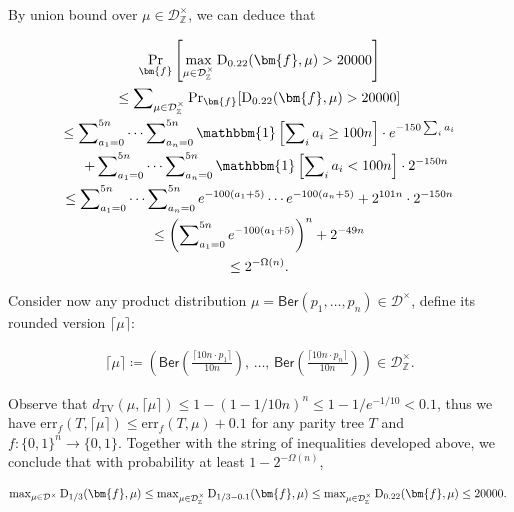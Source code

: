 \documentclass[10pt,a4paper]{article}
\begin{document}
By union bound over $\mu\in\mathcal{D}^{\times}_{\mathbb{Z}}$, we can deduce that\par


\[\begin{gathered}
\displaystyle\Pr_{\bm{f}}\left[\max_{\mu\in\mathcal{D}^{\times}_{\mathbb{Z}}}{\textup{D}}_{0.22}(\bm{f},\mu)>20000\right] \\
\displaystyle\leq \displaystyle\sum\nolimits_{\mu\in\mathcal{D}^{\times}_{\mathbb{Z}}}\Pr\nolimits_{\bm{f}}[{\textup{D}}_{0.22}(\bm{f},\mu)>20000] \\
\displaystyle\leq \displaystyle\sum\nolimits_{a_{1}=0}^{5n}\cdots\sum\nolimits_{a_{n}=0}^{5n}\mathbbm{1}\left[\sum\nolimits_{i}a_{i}\geq 100n\right]\cdot e^{-150\sum_{i}a_{i}} \\
\displaystyle\quad+\sum\nolimits_{a_{1}=0}^{5n}\cdots\sum\nolimits_{a_{n}=0}^{5n}\mathbbm{1}\left[\sum\nolimits_{i}a_{i}<100n\right]\cdot 2^{-150n} \\
\displaystyle\leq \displaystyle\sum\nolimits_{a_{1}=0}^{5n}\cdots\sum\nolimits_{a_{n}=0}^{5n}e^{-100(a_{1}+5)}\cdots e^{-100(a_{n}+5)}+2^{101n}\cdot 2^{-150n} \\
\displaystyle\leq \displaystyle\left(\sum\nolimits_{a_{1}=0}^{5n}e^{-100(a_{1}+5)}\right)^{n}+2^{-49n} \\
\displaystyle\leq \displaystyle 2^{-\Omega(n)}.
\end{gathered}\]


Consider now any product distribution $\mu=\mathsf{Ber}(p_{1},\ldots,p_{n})\in\mathcal{D}^{\times}$, define its rounded version $\lceil\mu\rceil$:\par


\[\begin{gathered}
\lceil\mu\rceil\coloneqq\left(\mathsf{Ber}\left(\frac{\lceil 10n\cdot p_{1}\rceil}{10n}\right),\,\ldots,\,\mathsf{Ber}\left(\frac{\lceil 10n\cdot p_{n}\rceil}{10n}\right)\right)\in\mathcal{D}^{\times}_{\mathbb{Z}}.
\end{gathered}\]


Observe that $d_{\mathrm{TV}}(\mu,\lceil\mu\rceil)\leq 1-(1-1/10n)^{n}\leq 1-1/e^{-1/10}<0.1$, thus we have $\mathrm{err}_{f}(T,\lceil\mu\rceil)\leq\mathrm{err}_{f}(T,\mu)+0.1$ for any parity tree $T$ and $f:\{0,1\}^{n}\to\{0,1\}$.
Together with the string of inequalities developed above, we conclude that with probability at least $1-2^{-\Omega(n)}$,\par


\[\begin{gathered}
\max\nolimits_{\mu\in\mathcal{D}^{\times}}{\textup{D}}_{1/3}(\bm{f},\mu)\leq\max\nolimits_{\mu\in\mathcal{D}^{\times}_{\mathbb{Z}}}{\textup{D}}_{1/3-0.1}(\bm{f},\mu)\leq\max\nolimits_{\mu\in\mathcal{D}^{\times}_{\mathbb{Z}}}{\textup{D}}_{0.22}(\bm{f},\mu)\leq 20000.\
\end{gathered}\]
\end{document}
